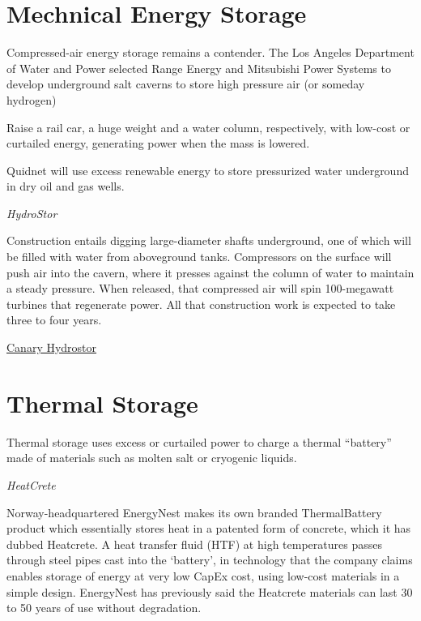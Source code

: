 \documentclass[
]{book}
\begin{document}
\hypertarget{mechnical-energy-storage}{%
\section{Mechnical Energy Storage}\label{mechnical-energy-storage}}

Compressed-air energy storage remains a contender. The Los Angeles Department of Water and Power selected Range Energy and Mitsubishi Power Systems to develop underground salt caverns to store high pressure air (or someday hydrogen)

Raise a rail car, a huge weight and a water column, respectively, with low-cost or curtailed energy, generating power when the mass is lowered.

Quidnet will use excess renewable energy to store pressurized water underground in dry oil and gas wells.

\emph{HydroStor}

Construction entails digging large-diameter shafts underground, one of which will be filled with water from aboveground tanks. Compressors on the surface will push air into the cavern, where it presses against the column of water to maintain a steady pressure. When released, that compressed air will spin 100-megawatt turbines that regenerate power. All that construction work is expected to take three to four years.

\href{https://www.canarymedia.com/articles/hydrostor-is-developing-truly-massive-grid-storage-in-watery-caverns/}{Canary Hydrostor}

\hypertarget{thermal-storage}{%
\section{Thermal Storage}\label{thermal-storage}}

Thermal storage uses excess or curtailed power to charge a thermal ``battery'' made of materials such as molten salt or cryogenic liquids.

\emph{HeatCrete}

Norway-headquartered EnergyNest makes its own branded ThermalBattery product which essentially stores heat in a patented form of concrete, which it has dubbed Heatcrete. A heat transfer fluid (HTF) at high temperatures passes through steel pipes cast into the `battery', in technology that the company claims enables storage of energy at very low CapEx cost, using low-cost materials in a simple design. EnergyNest has previously said the Heatcrete materials can last 30 to 50 years of use without degradation.
\end{document}
